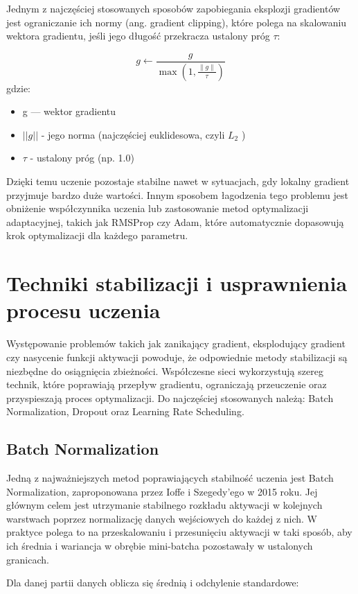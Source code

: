 Jednym z najczęściej stosowanych sposobów zapobiegania eksplozji gradientów jest ograniczanie ich normy (ang. gradient clipping), które polega na skalowaniu wektora gradientu, jeśli jego długość przekracza ustalony próg 
$\tau$:

\[
g \leftarrow \frac{g}{\max\left(1, \frac{\|g\|}{\tau}\right)}
\]
gdzie:
\begin{itemize}
	\item g — wektor gradientu
	\item  $||g||$ - jego norma (najczęściej euklidesowa, czyli $𝐿_2$ )
	\item $\tau$ - ustalony próg (np. 1.0)
\end{itemize}

Dzięki temu uczenie pozostaje stabilne nawet w sytuacjach, gdy lokalny gradient przyjmuje bardzo duże wartości. Innym sposobem łagodzenia tego problemu jest obniżenie współczynnika uczenia lub zastosowanie metod optymalizacji adaptacyjnej, takich jak RMSProp czy Adam, które automatycznie dopasowują krok optymalizacji dla każdego parametru.

\section{Techniki stabilizacji i usprawnienia procesu uczenia}

Występowanie problemów takich jak zanikający gradient, eksplodujący gradient czy nasycenie funkcji aktywacji powoduje, że odpowiednie metody stabilizacji są niezbędne do osiągnięcia zbieżności. Współczesne sieci wykorzystują szereg technik, które poprawiają przepływ gradientu, ograniczają przeuczenie oraz przyspieszają proces optymalizacji. Do najczęściej stosowanych należą: Batch Normalization, Dropout oraz Learning Rate Scheduling.

\subsection*{Batch Normalization}
Jedną z najważniejszych metod poprawiających stabilność uczenia jest Batch Normalization, zaproponowana przez Ioffe i Szegedy’ego w 2015 roku.
Jej głównym celem jest utrzymanie stabilnego rozkładu aktywacji w kolejnych warstwach poprzez normalizację danych wejściowych do każdej z nich. W praktyce polega to na przeskalowaniu i przesunięciu aktywacji w taki sposób, aby ich średnia i wariancja w obrębie mini-batcha pozostawały w ustalonych granicach.

Dla danej partii danych oblicza się średnią i odchylenie standardowe:

